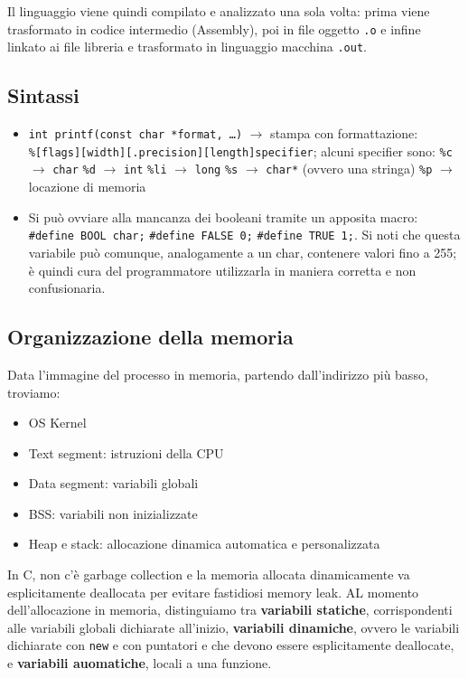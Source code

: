 \documentclass[11pt]{article}
\begin{document}
Il linguaggio viene quindi compilato e analizzato una sola volta: prima viene trasformato in codice intermedio (Assembly), poi in file oggetto \verb|.o| e infine linkato ai file libreria e trasformato in linguaggio macchina \verb|.out|.

\subsection{Sintassi}

\begin{itemize}
    \item\verb|int printf(const char *format, …)| $\rightarrow$ stampa con formattazione:\\ \verb|%[flags][width][.precision][length]specifier|; alcuni specifier sono:
        \subitem\verb|%c| $\rightarrow$ \verb|char|
        \subitem\verb|%d| $\rightarrow$ \verb|int|
        \subitem\verb|%li| $\rightarrow$ \verb|long|
        \subitem\verb|%s| $\rightarrow$ \verb|char*| (ovvero una stringa)
        \subitem\verb|%p| $\rightarrow$ locazione di memoria
    \item Si può ovviare alla mancanza dei booleani tramite un apposita macro: \verb|#define BOOL char;| \verb|#define FALSE 0;| \verb|#define TRUE 1;|. Si noti che questa variabile può comunque, analogamente a un char, contenere valori fino a 255; è quindi cura del programmatore utilizzarla in maniera corretta e non confusionaria.
\end{itemize}

\subsection{Organizzazione della memoria}

Data l'immagine del processo in memoria, partendo dall'indirizzo più basso, troviamo:
\begin{itemize}
    \item OS Kernel
    \item Text segment: istruzioni della CPU
    \item Data segment: variabili globali
    \item BSS: variabili non inizializzate
    \item Heap e stack: allocazione dinamica automatica e personalizzata
\end{itemize}

In C, non c'è garbage collection e la memoria allocata dinamicamente va esplicitamente deallocata per evitare fastidiosi memory leak. AL momento dell'allocazione in memoria, distinguiamo tra \textbf{variabili statiche}, corrispondenti alle variabili globali dichiarate all'inizio, \textbf{variabili dinamiche}, ovvero le variabili dichiarate con \verb|new| e con puntatori e che devono essere esplicitamente deallocate, e \textbf{variabili auomatiche}, locali a una funzione.
\end{document}
